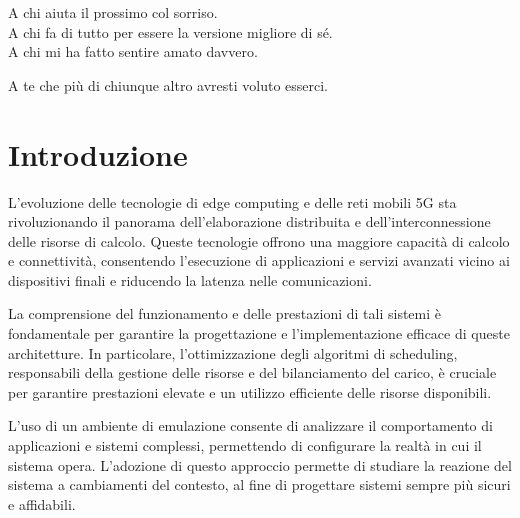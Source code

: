 \documentclass[12pt, hidelinks]{report}
\begin{document}
\frontespizio

\begin{dedication}
A chi aiuta il prossimo col sorriso.
\\
A chi fa di tutto per essere la versione migliore di sé.
\\
A chi mi ha fatto sentire amato davvero.


\vspace{5mm}

A te che più di chiunque altro avresti voluto esserci.
\end{dedication}

\beforepreface
\afterpreface

\chapter*{Introduzione}


L'evoluzione delle tecnologie di edge computing e delle reti mobili 5G sta rivoluzionando il panorama dell'elaborazione distribuita e dell'interconnessione delle risorse di calcolo. Queste tecnologie offrono una maggiore capacità di calcolo e connettività, consentendo l'esecuzione di applicazioni e servizi avanzati vicino ai dispositivi finali e riducendo la latenza nelle comunicazioni.

La comprensione del funzionamento e delle prestazioni di tali sistemi è fondamentale per garantire la progettazione e l'implementazione efficace di queste architetture. In particolare, l'ottimizzazione degli algoritmi di scheduling, responsabili della gestione delle risorse e del bilanciamento del carico, è cruciale per garantire prestazioni elevate e un utilizzo efficiente delle risorse disponibili.

L'uso di un ambiente di emulazione consente di analizzare il comportamento di applicazioni e sistemi complessi, permettendo di configurare la realtà in cui il sistema opera. L'adozione di questo approccio permette di studiare la reazione del sistema a cambiamenti del contesto, al fine di progettare sistemi sempre più sicuri e affidabili.

\end{document}
